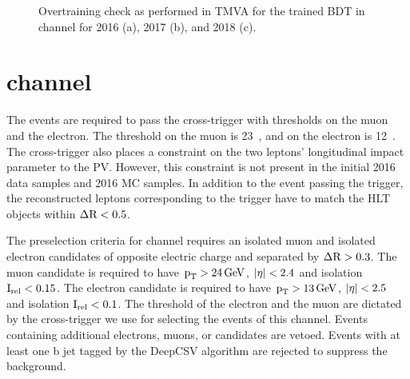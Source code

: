 \begin{figure}[htbp]
  \centering
  \caption{Overtraining check as performed in TMVA for the trained BDT in \muhad channel for 2016 (a), 2017 (b), and 2018 (c).}
  \label{fig:mutauh_bdttrain}
\end{figure}



\section{\texorpdfstring{\Hmue}{Hmutaue} channel}
The events are required to pass the cross-trigger with \pt thresholds on the muon and the electron. The \pt threshold on the muon is 23~\GeV, and on the electron is 12~\GeV. The cross-trigger also places a constraint on the two leptons' longitudinal impact parameter to the PV. However, this constraint is not present in the initial 2016 data samples and 2016 MC samples. In addition to the event passing the trigger, the reconstructed leptons corresponding to the trigger have to match the HLT objects within $\Delta \text{R} < 0.5$.

The preselection criteria for \mue channel requires an isolated muon and isolated electron candidates of opposite electric charge and separated by $\Delta \text{R} > 0.3$. The muon candidate is required to have $\text{p}_\text{T} > 24 \,\text{Ge\hspace{-.08em}V}$, $\lvert\eta\rvert < 2.4$ and isolation $\text{I}_\text{rel} < 0.15$. The electron candidate is required to have $\text{p}_\text{T} > 13 \,\text{Ge\hspace{-.08em}V}$, $\lvert\eta\rvert < 2.5$ and isolation $\text{I}_\text{rel} < 0.1$. The \pt threshold of the electron and the muon are dictated by the cross-trigger we use for selecting the events of this channel. Events containing additional electrons, muons, or \tauh candidates are vetoed. Events with at least one b jet tagged by the DeepCSV algorithm are rejected to suppress the \ttbar background.

